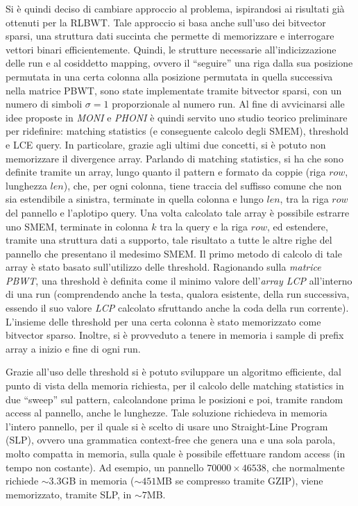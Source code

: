 \documentclass[a4paper,11pt, oneside,italian]{article}
\begin{document}
Si è quindi deciso di cambiare approccio al problema, ispirandosi ai risultati
già ottenuti per la RLBWT. Tale approccio si basa anche sull'uso dei bitvector
sparsi, una struttura dati succinta che permette di memorizzare e interrogare
vettori binari efficientemente.
Quindi, le strutture necessarie all'indicizzazione delle run e al cosiddetto
mapping, ovvero il ``seguire'' una riga dalla sua posizione permutata in una
certa colonna alla posizione permutata in quella successiva nella matrice PBWT,
sono state implementate tramite bitvector sparsi, con un numero di simboli
$\sigma=1$ proporzionale al numero run.
Al fine di avvicinarsi alle idee proposte in \textit{MONI} e \textit{PHONI} è
quindi servito uno studio teorico preliminare per ridefinire: matching
statistics (e conseguente calcolo degli SMEM), threshold e LCE query. In
particolare, grazie agli  
ultimi due concetti, si è potuto non memorizzare il divergence array.
Parlando di matching statistics, si ha che sono definite tramite un array, lungo
quanto il pattern e formato da coppie (riga $row$, lunghezza $len$), che, per
ogni colonna, tiene traccia del suffisso comune che non sia estendibile a
sinistra, terminate in quella colonna e lungo $len$, tra la riga $row$ del
pannello e l'aplotipo query. Una volta calcolato tale
array è possibile estrarre uno SMEM, terminate in colonna $k$ tra la query e la
riga $row$, ed estendere, tramite una struttura dati a supporto, tale risultato
a tutte le altre righe del pannello che presentano il medesimo SMEM.
Il primo metodo di calcolo di tale array è stato basato sull'utilizzo delle
threshold. Ragionando sulla \textit{matrice PBWT}, una threshold è definita
come il minimo valore dell'\textit{array LCP} all'interno di una run
(comprendendo anche la testa, qualora esistente, della run successiva, essendo
il suo valore \textit{LCP} calcolato sfruttando anche la coda della run
corrente). L'insieme delle threshold per una certa colonna è stato memorizzato
come bitvector sparso. Inoltre, si è provveduto a tenere in memoria i
sample di prefix array a inizio e fine di ogni run.

Grazie all'uso delle threshold si è potuto sviluppare un algoritmo
efficiente, dal punto di vista della memoria richiesta, per il calcolo delle
matching statistics in due ``sweep'' sul pattern, calcolandone prima le
posizioni e poi, tramite random access al pannello, anche le
lunghezze. Tale soluzione richiedeva in memoria l'intero pannello, per il quale
si è scelto di usare uno Straight-Line Program (SLP), ovvero una grammatica
context-free che genera una e una sola parola, molto compatta in memoria, sulla
quale è possibile effettuare random access (in tempo non costante). Ad esempio,
un pannello $70000 \times 46538$, che normalmente richiede $\sim 3.3$GB in
memoria ($\sim 451$MB se compresso tramite GZIP), viene memorizzato, tramite
SLP, in $\sim 7$MB.
\end{document}
